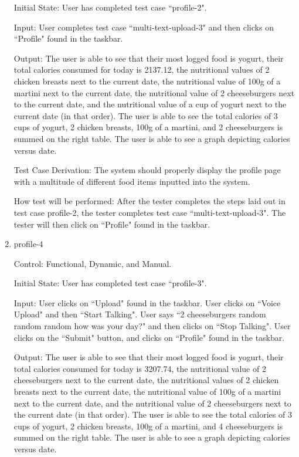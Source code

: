 \documentclass[12pt, titlepage]{article}
\begin{document}
\begin{enumerate}
		Initial State: User has completed test case ``profile-2".
		
		Input: User completes test case ``multi-text-upload-3" and then clicks on ``Profile" found in the taskbar.
		
		Output: The user is able to see that their most logged food is yogurt, their total calories consumed for today is 2137.12, the nutritional values of 2 chicken breasts next to the current date, the nutritional value of 100g of a martini next to the current date, the nutritional value of 2 cheeseburgers next to the current date, and the nutritional value of a cup of yogurt next to the current date (in that order). The user is able to see the total calories of 3 cups of yogurt, 2 chicken breasts, 100g of a martini, and 2 cheeseburgers is summed on the right table. The user is able to see a graph depicting calories versus date.
		
		Test Case Derivation: The system should properly display the profile page with a multitude of different food items inputted into the system.
		
		How test will be performed: After the tester completes the steps laid out in test case profile-2, the tester completes test case ``multi-text-upload-3". The tester will then click on ``Profile" found in the taskbar.
		
		\item{profile-4\\}
		
		Control: Functional, Dynamic, and Manual.
		
		Initial State: User has completed test case ``profile-3".
		
		Input: User clicks on ``Upload" found in the taskbar. User clicks on ``Voice Upload" and then ``Start Talking". User says ``2 cheeseburgers random random random how was your day?" and then clicks on ``Stop Talking". User clicks on the ``Submit" button, and clicks on ``Profile" found in the taskbar.
		
		Output: The user is able to see that their most logged food is yogurt, their total calories consumed for today is 3207.74, the nutritional value of 2 cheeseburgers next to the current date, the nutritional values of 2 chicken breasts next to the current date, the nutritional value of 100g of a martini next to the current date, and the nutritional value of 2 cheeseburgers next to the current date (in that order). The user is able to see the total calories of 3 cups of yogurt, 2 chicken breasts, 100g of a martini, and 4 cheeseburgers is summed on the right table. The user is able to see a graph depicting calories versus date.
		

\end{enumerate}
\end{document}
